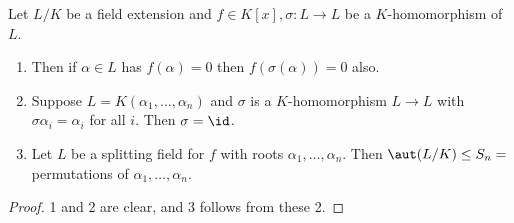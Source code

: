\documentclass[a4paper, 10pt, twocolumn]{amsart}
\begin{document}
\begin{lemma}
Let $L/K$ be a field extension and $f \in K[x], \sigma:L \to L$ be a $K$-homomorphism of $L$. 
\begin{enumerate}
\item Then if $\alpha \in L$ has $f(\alpha) = 0$ then $f(\sigma(\alpha)) = 0$ also.
\item Suppose $L = K(\alpha_1, \ldots, \alpha_n)$ and $\sigma$ is a $K$-homomorphism $L \to L$ with $\sigma \alpha_i =\alpha_i$ for all $i$. Then $\sigma = \id$.
\item Let $L$ be a splitting field for $f$ with roots $\alpha_1, \ldots, \alpha_n$. Then $\aut(L/K) \leq S_n = $ permutations of $\alpha_1, \ldots, \alpha_n$.
\end{enumerate}
\end{lemma}
\begin{proof}
1 and 2 are clear, and 3 follows from these 2.
\end{proof}
\end{document}
